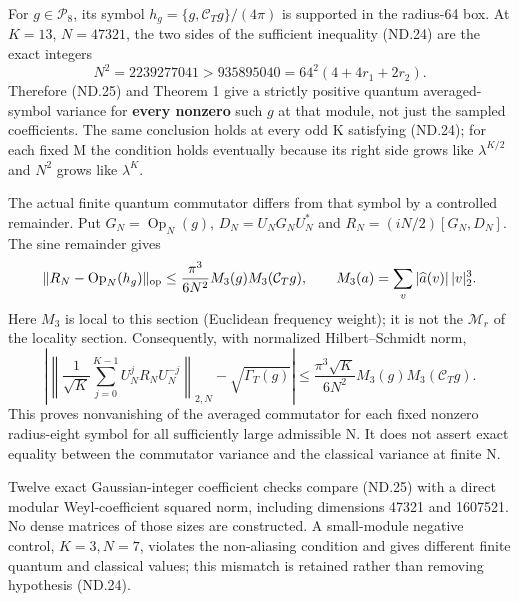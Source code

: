 For \(g\in\mathcal P_8\), its symbol \(h_g=\{g,\mathcal C_Tg\}/(4\pi)\) is supported in the radius-64 box. At \(K=13\), \(N=47321\), the two sides of the sufficient inequality (ND.24) are the exact integers \[
 N^2=2239277041>935895040=64^2(4+4r_1+2r_2).
\] Therefore (ND.25) and Theorem 1 give a strictly positive quantum averaged-symbol variance for \textbf{every nonzero} such \(g\) at that module, not just the sampled coefficients. The same conclusion holds at every odd K satisfying (ND.24); for each fixed M the condition holds eventually because its right side grows like \(\lambda^{K/2}\) and \(N^2\) grows like \(\lambda^K\).

The actual finite quantum commutator differs from that symbol by a controlled remainder. Put \(G_N=\operatorname{Op}_N(g)\), \(D_N=U_NG_NU_N^*\) and \(R_N=(iN/2)[G_N,D_N]\). The sine remainder gives \[
 \|R_N-\operatorname{Op}_N(h_g)\|_{\rm op}
     \leq\frac{\pi^3}{6N^2}M_3(g)M_3(\mathcal C_Tg),
 \qquad M_3(a)=\sum_v|\widehat a(v)|\,|v|_2^3.
\]
Here \(M_3\) is local to this section (Euclidean frequency weight); it is
not the \(\mathcal M_r\) of the locality section. Consequently, with normalized Hilbert--Schmidt norm, \[
 \left|\left\|\frac1{\sqrt K}\sum_{j=0}^{K-1}U_N^jR_NU_N^{-j}\right\|_{2,N}
                      -\sqrt{\Gamma_T(g)}\right|
 \leq\frac{\pi^3\sqrt K}{6N^2}M_3(g)M_3(\mathcal C_Tg).      \tag{ND.27}
\] This proves nonvanishing of the averaged commutator for each fixed nonzero radius-eight symbol for all sufficiently large admissible N. It does not assert exact equality between the commutator variance and the classical variance at finite N.

Twelve exact Gaussian-integer coefficient checks compare (ND.25) with a direct modular Weyl-coefficient squared norm, including dimensions 47321 and 1607521. No dense matrices of those sizes are constructed. A small-module negative control, \(K=3,N=7\), violates the non-aliasing condition and gives different finite quantum and classical values; this mismatch is retained rather than removing hypothesis (ND.24).
